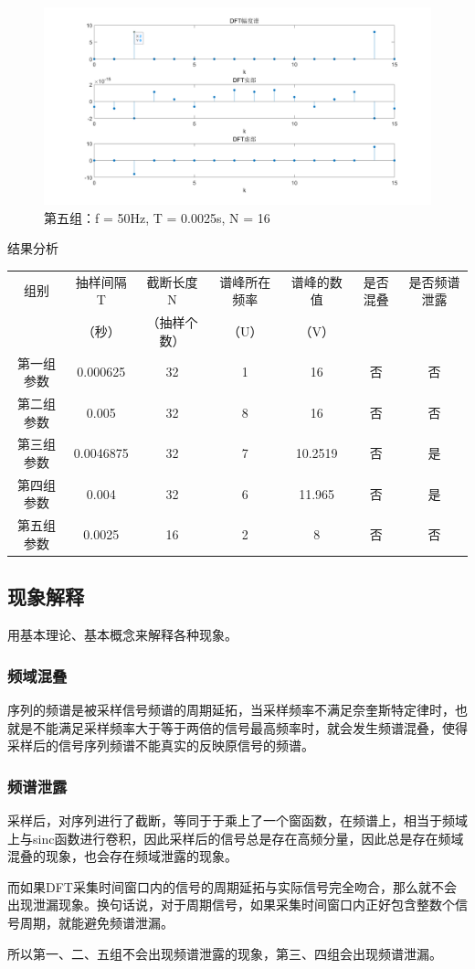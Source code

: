 \documentclass{../source/Experiment copy}
\begin{document}
\begin{figure}[H]
    \centering
    \includegraphics[width = \textwidth]{src/exp2_5_3.png}
    \caption{第五组：f = 50Hz, T = 0.0025s, N = 16}
\end{figure}
结果分析
\begin{table}[H]
    \centering
    \begin{tabular}{|c|c|c|c|c|c|c|}
        \hline
        组别       & 抽样间隔T & 截断长度N    & 谱峰所在频率 & 谱峰的数值 & 是否混叠 & 是否频谱泄露 \\
                   & （秒）    & （抽样个数） & （U）        & （V）      &          &              \\ \hline
        第一组参数 & 0.000625  & 32           & 1            & 16         & 否       & 否           \\ \hline
        第二组参数 & 0.005     & 32           & 8            & 16         & 否       & 否           \\ \hline
        第三组参数 & 0.0046875 & 32           & 7            & 10.2519    & 否       & 是           \\ \hline
        第四组参数 & 0.004     & 32           & 6            & 11.965     & 否       & 是           \\ \hline
        第五组参数 & 0.0025    & 16           & 2            & 8          & 否       & 否           \\ \hline
    \end{tabular}
\end{table}
\subsection{现象解释}
用基本理论、基本概念来解释各种现象。

\subsubsection{频域混叠}
序列的频谱是被采样信号频谱的周期延拓，当采样频率不满足奈奎斯特定律时，也就是不能满足采样频率大于等于两倍的信号最高频率时，就会发生频谱混叠，使得采样后的信号序列频谱不能真实的反映原信号的频谱。

\subsubsection{频谱泄露}

采样后，对序列进行了截断，等同于于乘上了一个窗函数，在频谱上，相当于频域上与sinc函数进行卷积，因此采样后的信号总是存在高频分量，因此总是存在频域混叠的现象，也会存在频域泄露的现象。

而如果DFT采集时间窗口内的信号的周期延拓与实际信号完全吻合，那么就不会出现泄漏现象。换句话说，对于周期信号，如果采集时间窗口内正好包含整数个信号周期，就能避免频谱泄漏。

所以第一、二、五组不会出现频谱泄露的现象，第三、四组会出现频谱泄漏。
\end{document}
